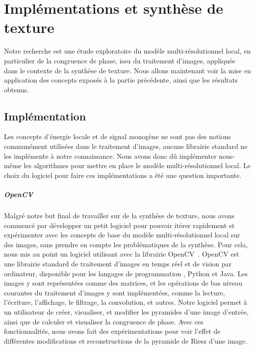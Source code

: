 \chapter{Implémentations et synthèse de texture}
\label{chap:chapitre2}

Notre recherche est une étude exploratoire du modèle multi-résolutionnel local, en particulier de la congruence de phase, issu du traitement d'images, appliquée dans le contexte de la synthèse de texture. Nous allons maintenant voir la mise en application des concepts exposés à la partie précédente, ainsi que les résultats obtenus.

\section{Implémentation}

Les concepts d'énergie locale et de signal monogène ne sont pas des notions communément utilisées dans le traitement d'images, aucune librairie standard ne les implémente à notre connaissance. Nous avons donc dû implémenter nous-même les algorithmes pour mettre en place le modèle multi-résolutionnel local. Le choix du logiciel pour faire ces implémentations a été une question importante.


\paragraph{OpenCV}

Malgré notre but final de travailler sur de la synthèse de texture, nous avons commencé par développer un petit logiciel pour pouvoir itérer rapidement et expérimenter avec les concepts de base du modèle multi-résolutionnel local sur des images, sans prendre en compte les problématiques de la synthèse. Pour cela, nous mis au point un logiciel utilisant \cpp avec la librairie OpenCV~\cite{opencv_library}. OpenCV est une librairie standard de traitement d'images en temps réel et de vision par ordinateur, disponible pour les langages de programmation \cpp, Python et Java. Les images y sont représentées comme des matrices, et les opérations de bas niveau courantes du traitement d'images y sont implémentées, comme la lecture, l'écriture, l'affichage, le filtrage, la convolution, et autres.  Notre logiciel permet à un utilisateur de créer, visualiser, et modifier les pyramides d'une image d'entrée, ainsi que de calculer et visualiser la congruence de phase. Avec ces fonctionnalités, nous avons fait des expérimentations pour voir l'effet de différentes modifications et reconstructions de la pyramide de Riesz d'une image.

